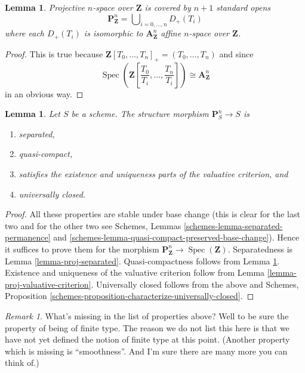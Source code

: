 \documentclass{stacks-project}
\theoremstyle{plain}
\newtheorem{lemma}[subsection]{Lemma}
\theoremstyle{definition}
\theoremstyle{remark}
\newtheorem{remark}[subsection]{Remark}
\numberwithin{equation}{subsection}
\def\Spec{\mathop{\mathrm{Spec}}}
\begin{document}
\begin{lemma}
\label{lemma-standard-covering-projective-space}
Projective $n$-space over $\mathbf{Z}$ is covered by
$n + 1$ standard opens
$$
\mathbf{P}^n_{\mathbf{Z}} =
\bigcup\nolimits_{i = 0, \ldots, n} D_{+}(T_i)
$$
where each $D_{+}(T_i)$ is isomorphic to $\mathbf{A}^n_{\mathbf{Z}}$
affine $n$-space over $\mathbf{Z}$.
\end{lemma}

\begin{proof}
This is true because
$\mathbf{Z}[T_0, \ldots, T_n]_{+} = (T_0, \ldots, T_n)$ and
since
$$
\Spec
\left(
\mathbf{Z}
\left[\frac{T_0}{T_i}, \ldots, \frac{T_n}{T_i}
\right]
\right)
\cong
\mathbf{A}^n_{\mathbf{Z}}
$$
in an obvious way.
\end{proof}

\begin{lemma}
\label{lemma-projective-space-separated}
Let $S$ be a scheme.
The structure morphism $\mathbf{P}^n_S \to S$ is
\begin{enumerate}
\item separated,
\item quasi-compact,
\item satisfies the existence and uniqueness parts of the valuative criterion,
and
\item universally closed.
\end{enumerate}
\end{lemma}

\begin{proof}
All these properties are stable under base change (this is clear for the
last two and for the other two see
Schemes, Lemmas
\ref{schemes-lemma-separated-permanence} and
\ref{schemes-lemma-quasi-compact-preserved-base-change}).
Hence it suffices to prove them for the morphism
$\mathbf{P}^n_{\mathbf{Z}} \to \Spec(\mathbf{Z})$.
Separatedness is Lemma \ref{lemma-proj-separated}. Quasi-compactness follows
from Lemma \ref{lemma-standard-covering-projective-space}.
Existence and uniqueness of the valuative criterion follow from
Lemma \ref{lemma-proj-valuative-criterion}.
Universally closed follows from the above and
Schemes, Proposition \ref{schemes-proposition-characterize-universally-closed}.
\end{proof}

\begin{remark}
\label{remark-missing-finite-type}
What's missing in the list of properties above? Well to be sure the property
of being of finite type. The reason we do not list this here is that we have
not yet defined the notion of finite type at this point. (Another property
which is missing is ``smoothness''. And I'm sure there are many more you can
think of.)
\end{remark}
\end{document}
